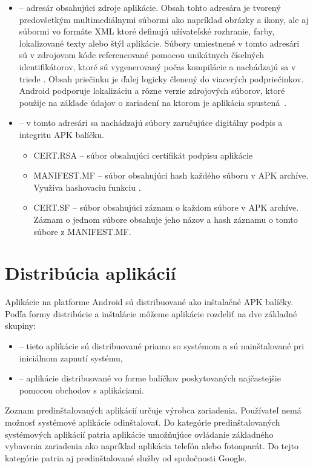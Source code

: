 \begin{itemize}
	\item {} -- adresár obsahujúci zdroje aplikácie. Obsah tohto adresára je tvorený predovšetkým multimediálnymi súbormi ako napríklad obrázky a ikony, ale aj súbormi vo formáte XML ktoré definujú užívateľské rozhranie, farby, lokalizované texty alebo štýl aplikácie. Súbory umiestnené v tomto adresári sú v zdrojovom kóde referencované pomocou unikátnych číselných identifikátorov, ktoré sú vygenerovaný počas kompilácie a nachádzajú sa v triede . Obsah priečinku je ďalej logicky členený do viacerých podpriečinkov. Android podporuje lokalizáciu a rôzne verzie zdrojových súborov, ktoré použije na základe údajov o zariadení na ktorom je aplikácia spustená~\cite{Resources}.
	
	\item {} -- v tomto adresári sa nachádzajú súbory zaručujúce digitálny podpis a integritu APK balíčku. 
		\begin{itemize}
			\item CERT.RSA  -- súbor obsahujúci certifikát podpisu aplikácie
			\item MANIFEST.MF  -- súbor obsahujúci hash každého súboru v APK archíve. Využíva hashovaciu funkciu .
			\item CERT.SF  -- súbor obsahujúci záznam o každom súbore v APK archíve. Záznam o jednom súbore obsahuje jeho názov a  hash záznamu o tomto súbore z MANIFEST.MF.
		\end{itemize}		
		
		
\end{itemize} 


\section{Distribúcia aplikácií}
Aplikácie na platforme Android sú distribuované ako inštalačné APK balíčky. 
Podľa formy distribúcie a inštalácie môžeme aplikácie rozdeliť na dve základné skupiny:
\begin{itemize}
 \item {} -- tieto aplikácie sú distribuované priamo so systémom a sú nainštalované pri iniciálnom zapnutí systému,
 \item {} -- aplikácie distribuované vo forme balíčkov poskytovaných najčastejšie pomocou obchodov s aplikáciami.
\end{itemize}

Zoznam predinštalovaných aplikácií určuje výrobca zariadenia. Používateľ nemá možnosť systémové aplikácie odinštalovať. Do kategórie predinštalovaných systémových aplikácií patria aplikácie umožňujúce ovládanie základného vybavenia zariadenia ako napríklad aplikácia telefón alebo fotoaparát. Do tejto kategórie patria aj predinštalované služby od spoločnosti Google. 

